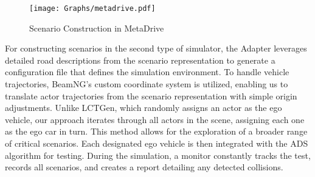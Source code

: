 

\begin{figure}[!t]
  \centering
  \texttt{[image: Graphs/metadrive.pdf]}
  \caption{Scenario Construction in MetaDrive}
  \label{fig:scen_meta}
\vspace{-4mm}
\end{figure}

For constructing scenarios in the second type of simulator, the Adapter leverages detailed road descriptions from the scenario representation to generate a configuration file that defines the simulation environment. To handle vehicle trajectories, BeamNG’s custom coordinate system is utilized, enabling us to translate actor trajectories from the scenario representation with simple origin adjustments. Unlike LCTGen, which randomly assigns an actor as the ego vehicle, our approach iterates through all actors in the scene, assigning each one as the ego car in turn. This method allows for the exploration of a broader range of critical scenarios. Each designated ego vehicle is then integrated with the ADS algorithm for testing. During the simulation, a monitor constantly tracks the test, records all scenarios, and creates a report detailing any detected collisions.


